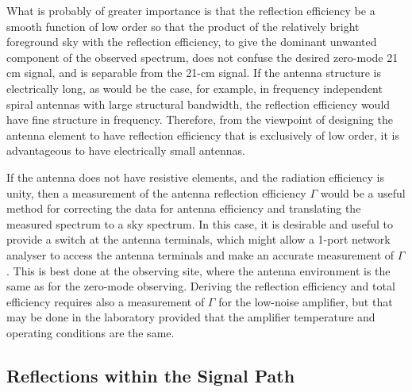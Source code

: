    What is probably of greater importance is that the reflection efficiency be a smooth function of low order so that the product of the relatively bright foreground sky with the reflection efficiency, to give the dominant unwanted component of the observed spectrum, does not confuse the desired zero-mode 21 cm signal, and is separable from the 21-cm signal.  If the antenna structure is electrically long, as would be the case, for example, in frequency independent spiral antennas with large structural bandwidth, the reflection efficiency would have fine structure in frequency.  Therefore, from the viewpoint of designing the antenna element to have reflection efficiency that is exclusively of low order, it is advantageous to have electrically small antennas.
   
   If the antenna does not have resistive elements, and the radiation efficiency is unity, then a measurement of the antenna reflection efficiency $\Gamma$ would be a useful method for correcting the data for antenna efficiency and translating the measured spectrum to a sky spectrum. In this case, it is desirable and useful to provide a switch at the antenna terminals, which might allow a 1-port network analyser to access the antenna terminals and make an accurate measurement of $\Gamma$.  This is best done at the observing site, where the antenna environment is the same as for the zero-mode observing.  Deriving the reflection efficiency and total efficiency requires also a measurement of $\Gamma$ for the low-noise amplifier, but that may be done in the laboratory provided that the amplifier temperature and operating conditions are the same.
   
   
\subsection{Reflections within the Signal Path}

